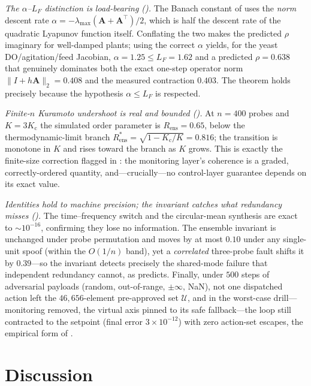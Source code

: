 \documentclass[11pt,a4paper,twocolumn]{article}
\theoremstyle{thmstyle}
\theoremstyle{definition}
\theoremstyle{remark}
\newcommand{\Us}{\mathcal{U}}
\newcommand{\Rens}{R_{\mathrm{ens}}}
\newcommand{\Kc}{K_{\mathrm{c}}}
\begin{document}
\emph{The $\alpha$--$L_F$ distinction is load-bearing
().} The Banach constant of  uses the
\emph{norm} descent rate $\alpha=-\lambda_{\max}(\mathbf A+\mathbf
A^{\top})/2$, which is half the descent rate of the quadratic Lyapunov
function itself. Conflating the two makes the predicted $\rho$ imaginary
for well-damped plants; using the correct $\alpha$ yields, for the yeast
DO/agitation/feed Jacobian, $\alpha=1.25\le L_F=1.62$ and a predicted
$\rho=0.638$ that genuinely dominates both the exact one-step operator
norm $\lVert I+h\mathbf A\rVert_2=0.408$ and the measured contraction
$0.403$. The theorem holds precisely because the hypothesis $\alpha\le
L_F$ is respected.

\emph{Finite-$n$ Kuramoto undershoot is real and bounded
().} At $n=400$ probes and $K=3\Kc$ the simulated order
parameter is $\Rens=0.65$, below the thermodynamic-limit branch
$\Rens^{\ast}=\sqrt{1-\Kc/K}=0.816$; the transition is monotone in $K$
and rises toward the branch as $K$ grows. This is exactly the finite-size
correction flagged in : the monitoring layer's
coherence is a graded, correctly-ordered quantity, and---crucially---no
control-layer guarantee depends on its exact value.

\emph{Identities hold to machine precision; the invariant catches what
redundancy misses ().} The
time--frequency switch and the circular-mean synthesis are exact to
$\sim10^{-16}$, confirming they lose no information. The ensemble
invariant is unchanged under probe permutation and moves by at most
$0.10$ under any single-unit spoof (within the $O(1/n)$ band), yet a
\emph{correlated} three-probe fault shifts it by $0.39$---so the
invariant detects precisely the shared-mode failure that independent
redundancy cannot, as  predicts. Finally,
under $500$ steps of adversarial payloads (random, out-of-range,
$\pm\infty$, NaN), not one dispatched action left the $46{,}656$-element
pre-approved set $\Us$, and in the worst-case drill---monitoring removed,
the virtual axis pinned to its safe fallback---the loop still contracted
to the setpoint (final error $3\times10^{-12}$) with zero action-set
escapes, the empirical form of .



\section{Discussion}
\label{sec:discussion}
\end{document}
